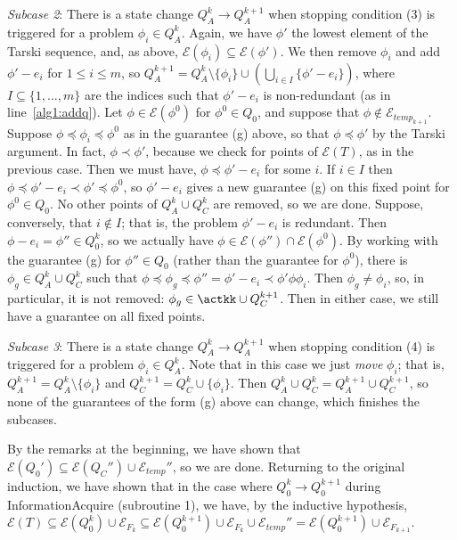 \documentclass[11pt,reqno]{amsart}
\theoremstyle{definition}
\numberwithin{equation}{section}
\newcommand{\pre}{\phi}
\newcommand{\sub}{\subseteq}
\newcommand{\fix}{\mathcal{E}}
\newcommand{\peq}{\preceq}
\newcommand{\pe}{\prec}
\newcommand{\acto}{Q_0}
\newcommand{\actok}{Q_0^k}
\newcommand{\actokk}{Q_0^{k+1}}
\newcommand{\actak}{Q_A^k}
\newcommand{\actak}{Q_A^{k}}
\newcommand{\actakk}{Q_A^{k + 1}}
\newcommand{\actc}{Q_C}
\newcommand{\actck}{Q_C^k}
\newcommand{\actckk}{Q_C^{k + 1}}
\newcommand{\preo}{\pre^{0}}
\newcommand{\fixfind}{\mathcal{E}_F}
\newcommand{\fixtemp}{\mathcal{E}_{temp}}
\begin{document}
\begin{enumerate}
\emph{Subcase 2}: There is a state change $\actak \to \actakk$ when stopping condition (3) is triggered for a problem $\pre_i \in \actak$.
Again, we have $\pre'$ the lowest element of the Tarski sequence, and, as above, $\fix(\pre_i) \sub \fix(\pre')$.
We then remove $\pre_i$ and add $\pre' - e_i$ for $1 \leq i \leq m$, so $\actakk = \actak \setminus \{\pre_i \} \cup \left (\bigcup_{i \in I} \{\pre' - e_i \} \right )$, where $I \sub \{1,\hdots,m\}$ are the indices such that $\pre' - e_i$ is non-redundant (as in line~\ref{alg1:addq}).
Let $\pre \in \fix(\preo)$ for $\preo \in \acto$, and suppose that $\pre \not \in \fixtemp_{k +1}$.
Suppose $\pre \peq \pre_i \peq \preo$ as in the guarantee (g) above, so that $\pre \peq \pre'$ by the Tarski argument.
In fact, $\pre \pe \pre'$, because we check for points of $\fix(T)$, as in the previous case.
Then we must have, $\pre \peq \pre' - e_i$ for some $i$.
If $i \in I$ then $\pre \peq \pre' - e_i \pe \pre' \peq \preo$, so $\pre' - e_i$ gives a new guarantee (g) on this fixed point for $\preo \in \acto$.
No other points of $\actak \cup \actck$ are removed, so we are done.
Suppose, conversely, that $i \not \in I$; that is, the problem $\pre' - e_i$ is redundant.
Then $\pre - e_i = \pre'' \in \actok$, so we actually have $\pre \in \fix(\pre'') \cap \fix(\preo)$.
By working with the guarantee (g) for $\pre'' \in \acto$ (rather than the guarantee for $\preo$), there is $\pre_g \in \actak \cup \actck$ such that $\pre \peq \pre_g \peq \pre'' = \pre' - e_i \pe \pre' \pre \pre_i$.
Then $\pre_g \not = \pre_i$, so, in particular, it is not removed: $\pre_g \in \actkk \cup \actckk$.
Then in either case, we still have a guarantee on all fixed points.

\emph{Subcase 3}: There is a state change $\actak \to \actakk$ when stopping condition (4) is triggered for a problem $\pre_i \in \actak$.
Note that in this case we just \emph{move} $\pre_i$; that is, $\actakk = \actak \setminus \{\pre_i\}$ and $\actckk = \actck \cup \{\pre_i\}$.
Then $\actak \cup \actck = \actakk \cup \actckk$, so none of the guarantees of the form (g) above can change, which finishes the subcases.

By the remarks at the beginning, we have shown that $\fix(\acto') \sub \fix(\actc'') \cup \fixtemp''$, so we are done.
Returning to the original induction, we have shown that in the case where $\actok \to \actokk$ during InformationAcquire (subroutine 1), we have, by the inductive hypothesis, $\fix(T) \sub \fix(\actok) \cup \fixfind_k \sub \fix(\actokk) \cup \fixfind_k \cup \fixtemp'' = \fix(\actokk) \cup \fixfind_{k + 1}$.


\end{enumerate}
\end{document}
